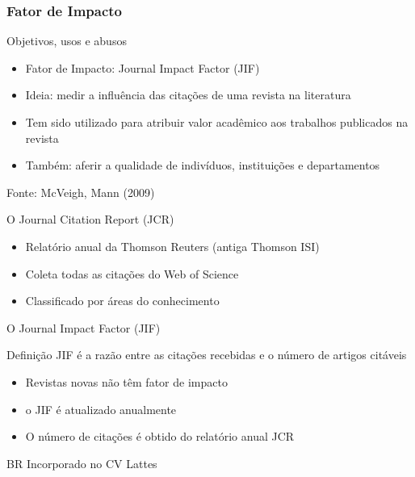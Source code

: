 \documentclass{beamer}
\begin{document}
\subsubsection{Fator de Impacto}

\begin{frame}{Objetivos, usos e abusos}
  \begin{itemize}
    \footnotesize
  \item Fator de Impacto: Journal Impact Factor (JIF)
    \bigskip
  \item Ideia: medir a influência das citações de uma revista na literatura
    \bigskip
  \item Tem sido utilizado para atribuir valor acadêmico aos trabalhos publicados na revista
    \bigskip
  \item Também: aferir a qualidade de indivíduos, instituições e departamentos
  \end{itemize}

  \vfill
  \footnotesize
  \hfill Fonte: McVeigh, Mann (2009)
\end{frame}

\begin{frame}{O Journal Citation Report (JCR)}
  \begin{itemize}
    \footnotesize
  \item Relatório anual da Thomson Reuters (antiga Thomson ISI)
    \bigskip
  \item Coleta todas as citações do Web of Science
    \bigskip
  \item Classificado por áreas do conhecimento
  \end{itemize}
\end{frame}

\begin{frame}{O Journal Impact Factor (JIF)}
  \begin{block}{Definição}
    JIF é a razão entre as citações recebidas e o número de artigos citáveis
  \end{block}
  \bigskip
  \begin{itemize}
    \footnotesize
  \item Revistas novas não têm fator de impacto
  \item o JIF é atualizado anualmente
  \item O número de citações é obtido do relatório anual JCR
  \end{itemize}
  \begin{block}{BR}
    \footnotesize
    Incorporado no CV Lattes
  \end{block}
\end{frame}
\end{document}
